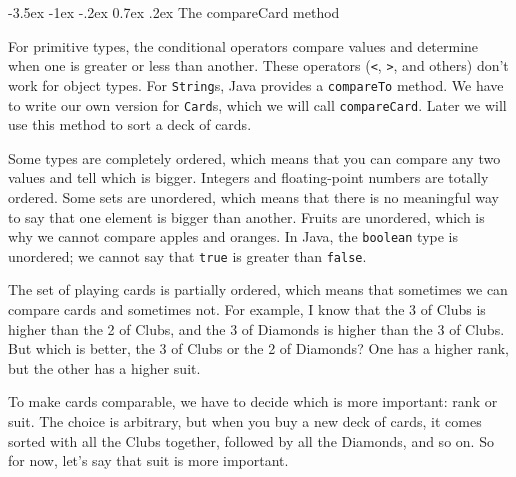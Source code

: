 \documentclass[12pt]{book}
\makeatletter
\theoremstyle{exercise}
\newcommand{\java}[1]{\verb"#1"}
\renewcommand{\section}{\@startsection{section}{1}{\z@}%
    {-3.5ex \@plus -1ex \@minus -.2ex}%
    {0.7ex \@plus.2ex}%
    {\normalfont\Large\bfseries}}
\newcommand{\java}[1]{\lstinline{#1}} %
\makeatother
\begin{document}



\section{The compareCard method}
\label{compare}


For primitive types, the conditional operators compare values and determine when one is greater or less than another.
These operators (\java{<}, \java{>}, and others) don't work for object types.
For \java{String}s, Java provides a \java{compareTo} method.
We have to write our own version for \java{Card}s, which we will call \java{compareCard}.
Later we will use this method to sort a deck of cards.


Some types are completely ordered, which means that you can compare any two values and tell which is bigger.
Integers and floating-point numbers are totally ordered.
Some sets are unordered, which means that there is no meaningful way to say that one element is bigger than another.
Fruits are unordered, which is why we cannot compare apples and oranges.
In Java, the \java{boolean} type is unordered; we cannot say that \java{true} is greater than \java{false}.

The set of playing cards is partially ordered, which means that sometimes we can compare cards and sometimes not.
For example, I know that the 3 of Clubs is higher than the 2 of Clubs, and the 3 of Diamonds is higher than the 3 of Clubs.
But which is better, the 3 of Clubs or the 2 of Diamonds?
One has a higher rank, but the other has a higher suit.


To make cards comparable, we have to decide which is more important: rank or suit.
The choice is arbitrary, but when you buy a new deck of cards, it comes sorted with all the Clubs together, followed by all the Diamonds, and so on.
So for now, let's say that suit is more important.
\end{document}
